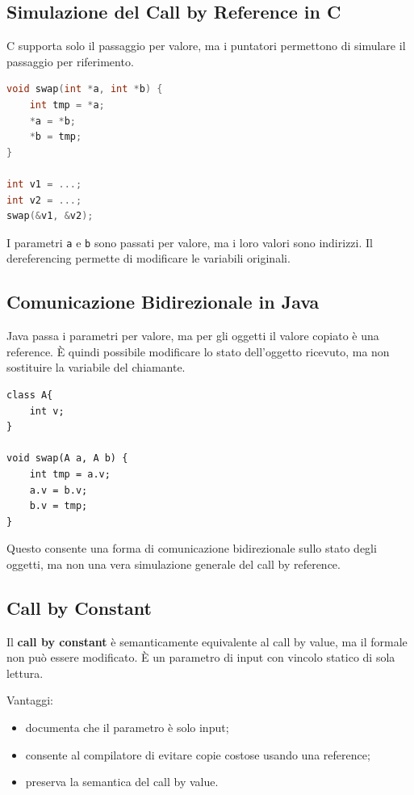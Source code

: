 \documentclass{article}
\begin{document}
\subsection{Simulazione del Call by Reference in C}

C supporta solo il passaggio per valore, ma i puntatori permettono di simulare il passaggio per riferimento.

\begin{lstlisting}[language=C]
void swap(int *a, int *b) {
    int tmp = *a;
    *a = *b;
    *b = tmp;
}

int v1 = ...;
int v2 = ...;
swap(&v1, &v2);
\end{lstlisting}

I parametri \texttt{a} e \texttt{b} sono passati per valore, ma i loro valori sono indirizzi. Il dereferencing permette di modificare le variabili originali.

\subsection{Comunicazione Bidirezionale in Java}

Java passa i parametri per valore, ma per gli oggetti il valore copiato è una reference. È quindi possibile modificare lo stato dell'oggetto ricevuto, ma non sostituire la variabile del chiamante.

\begin{lstlisting}
class A{
    int v;
}

void swap(A a, A b) {
    int tmp = a.v;
    a.v = b.v;
    b.v = tmp;
}
\end{lstlisting}

Questo consente una forma di comunicazione bidirezionale sullo stato degli oggetti, ma non una vera simulazione generale del call by reference.

\subsection{Call by Constant}

Il \textbf{call by constant} è semanticamente equivalente al call by value, ma il formale non può essere modificato. È un parametro di input con vincolo statico di sola lettura.

Vantaggi:
\begin{itemize}
  \item documenta che il parametro è solo input;
  \item consente al compilatore di evitare copie costose usando una reference;
  \item preserva la semantica del call by value.
\end{itemize}
\end{document}
